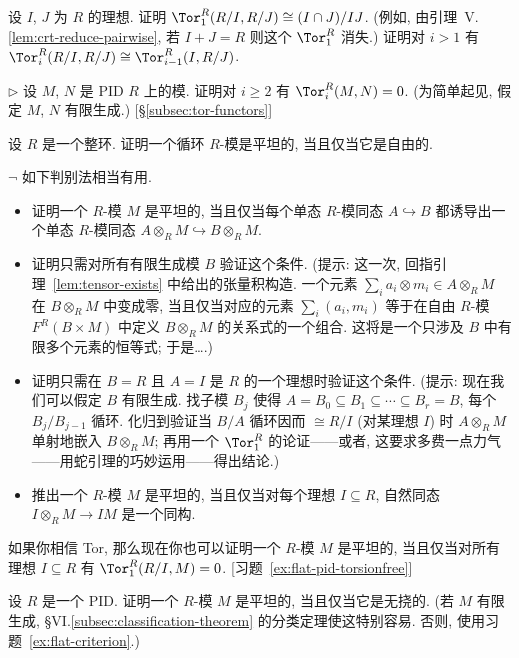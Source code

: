 \begin{prob}\label{ex:tor-ideal-intersect}
设 $I$, $J$ 为 $R$ 的理想. 证明 $\Tor_1^R(R/I,R/J)\cong(I\cap J)/IJ$. (例如, 由引理~V.\ref{lem:crt-reduce-pairwise}, 若 $I+J=R$ 则这个 $\Tor_1^R$ 消失.) 证明对 $i>1$ 有 $\Tor_i^R(R/I,R/J)\cong\Tor_{i-1}^R(I,R/J)$.
\end{prob}

\begin{prob}\label{ex:tor-pid-vanish}
$\triangleright$ 设 $M$, $N$ 是 PID $R$ 上的模. 证明对 $i\geq 2$ 有 $\Tor_i^R(M,N)=0$. (为简单起见, 假定 $M$, $N$ 有限生成.) [\S\ref{subsec:tor-functors}]
\end{prob}

\begin{prob}\label{ex:flat-cyclic}
设 $R$ 是一个整环. 证明一个循环 $R$-模是平坦的, 当且仅当它是自由的.
\end{prob}

\begin{prob}\label{ex:flat-criterion}
$\neg$ 如下判别法相当有用.
\begin{itemize}
\item 证明一个 $R$-模 $M$ 是平坦的, 当且仅当每个单态 $R$-模同态 $A\hookrightarrow B$ 都诱导出一个单态 $R$-模同态 $A\otimes_R M\hookrightarrow B\otimes_R M$.
\item 证明只需对所有有限生成模 $B$ 验证这个条件. (提示: 这一次, 回指引理~\ref{lem:tensor-exists} 中给出的张量积构造. 一个元素 $\sum_i a_i\otimes m_i\in A\otimes_R M$ 在 $B\otimes_R M$ 中变成零, 当且仅当对应的元素 $\sum_i(a_i,m_i)$ 等于在自由 $R$-模 $F^R(B\times M)$ 中定义 $B\otimes_R M$ 的关系式的一个组合. 这将是一个只涉及 $B$ 中有限多个元素的恒等式; 于是\ldots.)
\item 证明只需在 $B=R$ 且 $A=I$ 是 $R$ 的一个理想时验证这个条件. (提示: 现在我们可以假定 $B$ 有限生成. 找子模 $B_j$ 使得 $A=B_0\subseteq B_1\subseteq\cdots\subseteq B_r=B$, 每个 $B_j/B_{j-1}$ 循环. 化归到验证当 $B/A$ 循环因而 $\cong R/I$ (对某理想 $I$) 时 $A\otimes_R M$ 单射地嵌入 $B\otimes_R M$; 再用一个 $\Tor_1^R$ 的论证——或者, 这要求多费一点力气——用蛇引理的巧妙运用——得出结论.)
\item 推出一个 $R$-模 $M$ 是平坦的, 当且仅当对每个理想 $I\subseteq R$, 自然同态 $I\otimes_R M\to IM$ 是一个同构.
\end{itemize}
如果你相信 Tor, 那么现在你也可以证明一个 $R$-模 $M$ 是平坦的, 当且仅当对所有理想 $I\subseteq R$ 有 $\Tor_1^R(R/I,M)=0$. [习题~\ref{ex:flat-pid-torsionfree}]
\end{prob}

\begin{prob}\label{ex:flat-pid-torsionfree}
设 $R$ 是一个 PID. 证明一个 $R$-模 $M$ 是平坦的, 当且仅当它是无挠的. (若 $M$ 有限生成, §VI.\ref{subsec:classification-theorem} 的分类定理使这特别容易. 否则, 使用习题~\ref{ex:flat-criterion}.)
\end{prob}

